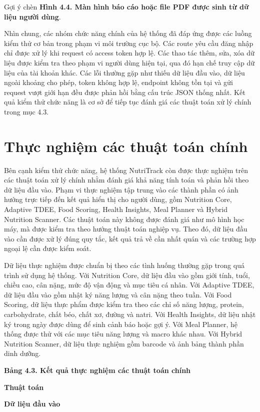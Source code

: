 \documentclass[12pt, a4paper]{report}
\begin{document}
Gợi ý chèn \textbf{Hình 4.4. Màn hình báo cáo hoặc file PDF được sinh từ dữ liệu người dùng}.

Nhìn chung, các nhóm chức năng chính của hệ thống đã đáp ứng được các luồng kiểm thử cơ bản trong phạm vi môi trường cục bộ. Các route yêu cầu đăng nhập chỉ được xử lý khi request có access token hợp lệ. Các thao tác thêm, sửa, xóa dữ liệu được kiểm tra theo phạm vi người dùng hiện tại, qua đó hạn chế truy cập dữ liệu của tài khoản khác. Các lỗi thường gặp như thiếu dữ liệu đầu vào, dữ liệu ngoài khoảng cho phép, token không hợp lệ, endpoint không tồn tại và gửi request vượt giới hạn đều được phản hồi bằng cấu trúc JSON thống nhất. Kết quả kiểm thử chức năng là cơ sở để tiếp tục đánh giá các thuật toán xử lý chính trong mục 4.3.

\section{Thực nghiệm các thuật toán chính}Bên cạnh kiểm thử chức năng, hệ thống NutriTrack còn được thực nghiệm trên các thuật toán xử lý chính nhằm đánh giá khả năng tính toán và phản hồi theo dữ liệu đầu vào. Phạm vi thực nghiệm tập trung vào các thành phần có ảnh hưởng trực tiếp đến kết quả hiển thị cho người dùng, gồm Nutrition Core, Adaptive TDEE, Food Scoring, Health Insights, Meal Planner và Hybrid Nutrition Scanner. Các thuật toán này không được đánh giá như mô hình học máy, mà được kiểm tra theo hướng thuật toán nghiệp vụ. Theo đó, dữ liệu đầu vào cần được xử lý đúng quy tắc, kết quả trả về cần nhất quán và các trường hợp ngoại lệ cần được kiểm soát.

Dữ liệu thực nghiệm được chuẩn bị theo các tình huống thường gặp trong quá trình sử dụng hệ thống. Với Nutrition Core, dữ liệu đầu vào gồm giới tính, tuổi, chiều cao, cân nặng, mức độ vận động và mục tiêu cá nhân. Với Adaptive TDEE, dữ liệu đầu vào gồm nhật ký năng lượng và cân nặng theo tuần. Với Food Scoring, dữ liệu thực phẩm được kiểm tra theo các chỉ số năng lượng, protein, carbohydrate, chất béo, chất xơ, đường và natri. Với Health Insights, dữ liệu nhật ký trong ngày được dùng để sinh cảnh báo hoặc gợi ý. Với Meal Planner, hệ thống được thử với các mục tiêu năng lượng và macro khác nhau. Với Hybrid Nutrition Scanner, dữ liệu thực nghiệm gồm barcode và ảnh bảng thành phần dinh dưỡng.

\textbf{Bảng 4.3. Kết quả thực nghiệm các thuật toán chính}

\textbf{Thuật toán}

\textbf{Dữ liệu đầu vào}
\end{document}
